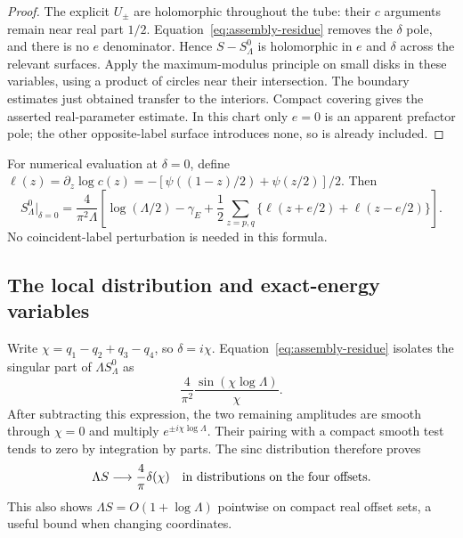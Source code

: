 \begin{proof}
The explicit $U_\pm$ are holomorphic throughout the tube: their $c$
arguments remain near real part $1/2$. Equation~\eqref{eq:assembly-residue}
removes the $\delta$ pole, and there is no $e$ denominator. Hence
$S-S_\Lambda^0$ is holomorphic in $e$ and $\delta$ across the relevant
surfaces. Apply the maximum-modulus principle on small disks in these
variables, using a product of circles near their intersection. The
boundary estimates just obtained transfer to the interiors. Compact
covering gives the asserted real-parameter estimate. In this chart
only $e=0$ is an apparent prefactor pole; the other opposite-label
surface introduces none, so is already included.
\end{proof}

For numerical evaluation at $\delta=0$, define
$\ell(z)=\partial_z\log c(z)
=-[\psi((1-z)/2)+\psi(z/2)]/2$. Then
\begin{equation}
 S_\Lambda^0\big|_{\delta=0}
 =\frac{4}{\pi^2\Lambda}
 \left[\log(\Lambda/2)-\gamma_E
 +\frac12\sum_{z=p,q}\{\ell(z+e/2)+\ell(z-e/2)\}\right].
 \label{eq:assembly-zero-value}
\end{equation}
No coincident-label perturbation is needed in this formula.

\subsection{The local distribution and exact-energy variables}
Write $\chi=q_1-q_2+q_3-q_4$, so $\delta=i\chi$.
Equation~\eqref{eq:assembly-residue} isolates the singular part of
$\Lambda S_\Lambda^0$ as
\begin{equation}
 \frac{4}{\pi^2}\frac{\sin(\chi\log\Lambda)}{\chi}.
 \label{eq:assembly-sinc}
\end{equation}
After subtracting this expression, the two remaining amplitudes are
smooth through $\chi=0$ and multiply $e^{\pm i\chi\log\Lambda}$.
Their pairing with a compact smooth test tends to zero by integration
by parts. The sinc distribution therefore proves
\begin{equation}
 \Lambda S\longrightarrow\frac4\pi\delta(\chi)
 \quad\hbox{in distributions on the four offsets}.
 \label{eq:raw-S-delta}
\end{equation}
This also shows $\Lambda S=O(1+\log\Lambda)$ pointwise on compact real
offset sets, a useful bound when changing coordinates.


